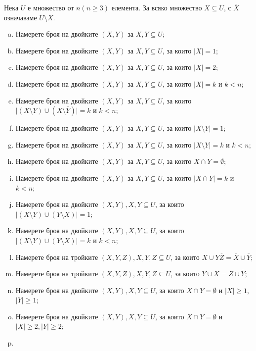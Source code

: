 \begin{prb} %
  Нека $U$ е множество от $n (n\geq 3)$ елемента. За всяко множество $X\subseteq U$, с $\overline{X}$ означаваме $U\setminus X$.
  \begin{enumerate}[a)]
  \item
    Намерете броя на двойките $(X,Y)$ за $X,Y\subseteq U$;
  \item
    Намерете броя на двойките $(X,Y)$ за $X,Y\subseteq U$, за които $\vert{X}\vert = 1$;
  \item
    Намерете броя на двойките $(X,Y)$ за $X,Y\subseteq U$, за които $\vert{X}\vert = 2$;
  \item
    Намерете броя на двойките $(X,Y)$ за $X,Y\subseteq U$, за които $\vert{X}\vert = k$ и $k < n$;
  \item
    Намерете броя на двойките $(X,Y)$ за $X,Y\subseteq U$, за които $\vert{(X\setminus{Y})\cup (X\setminus\overline{Y})}\vert = k$ и $k < n$;
  \item
    Намерете броя на двойките $(X,Y)$ за $X,Y\subseteq U$, за които $\vert{X\setminus Y}\vert = 1$;
  \item
    Намерете броя на двойките $(X,Y)$ за $X,Y\subseteq U$, за които $\vert{X\setminus Y}\vert = k$ и $k < n$;
  \item
    Намерете броя на двойките $(X,Y)$ за $X,Y\subseteq U$, за които $X\cap Y = \emptyset$;
  \item
    Намерете броя на двойките $(X,Y)$ за $X,Y\subseteq U$, за които $\vert{X\cap Y}\vert = k$ и $k < n$;
  \item
    Намерете броя на двойките $(X,Y), X,Y\subseteq U$, за които $|(X\setminus Y)\cup(Y\setminus X)| = 1$;
  \item
    Намерете броя на двойките $(X,Y), X,Y\subseteq U$, за които $|(X\setminus Y)\cup(Y\setminus X)| = k$ и $k < n$;
  \item
    Намерете броя на тройките $(X,Y,Z), X,Y,Z\subseteq U$, за които $X\cup Y\overline{Z} = \overline{X}\cup\overline{Y}$;
  \item
    Намерете броя на тройките $(X,Y,Z), X,Y,Z\subseteq U$, за които $Y\cup X = Z\cup\overline{Y}$;
  \item
    Намерете броя на двойките $(X,Y), X,Y\subseteq U$, за които $X\cap Y = \emptyset$ и
    $|X|\geq 1$, $|Y|\geq 1$;
  \item
    Намерете броя на двойките $(X,Y), X,Y\subseteq U$, за които $X\cap Y = \emptyset$ и 
    $|X|\geq 2, |Y|\geq 2$;
  \item

\end{enumerate}
\end{prb}
